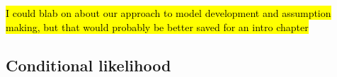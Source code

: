 \hl{I could blab on about our approach to model development and
  assumption making, but that would probably be better saved for an
  intro chapter}

\subsection{Conditional likelihood}


